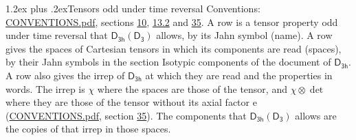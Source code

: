 \documentclass[10pt,a4paper]{article}
\makeatletter
\renewcommand\section{\@startsection{section}{1}{\z@}{-3ex plus -1ex minus -.2ex}%
  {1.2ex plus .2ex}{\normalfont\large\sffamily\bfseries\color{parttitle}}}
\numberwithin{equation}{section}
\newcommand{\grp}[1]{\mathsf{#1}}
\newcommand{\irrprod}{\otimes}
\makeatother
\begin{document}
\section{Tensors odd under time reversal}\label{s:time_odd}
Conventions: \href{../../CONVENTIONS.pdf}{CONVENTIONS.pdf}, sections \href{../../../rotation/CONVENTIONS.pdf\#conv.10}{10}, \href{../../../rotation/CONVENTIONS.pdf\#conv.13.2}{13.2} and \href{../../CONVENTIONS.pdf\#conv.35}{35}.
\leavevmode\label{n:head.name.property}A row is a tensor property odd under time reversal that $\grp{D_{3h}}(\grp{D_{3}})$ allows, by its Jahn symbol (name). \label{n:head.spaces}A row gives the spaces of Cartesian tensors in which its components are read (spaces), by their Jahn symbols in the section Isotypic components of the document of \href{../../../rotation/data/pdf/D3h.pdf}{$\grp{D_{3h}}$}. \label{n:head.properties}A row also gives the irrep of $\grp{D_{3h}}$ at which they are read and the properties in words. The irrep is $\chi$ where the spaces are those of the tensor, and $\chi \irrprod \det$ where they are those of the tensor without its axial factor e (\href{../../CONVENTIONS.pdf}{CONVENTIONS.pdf}, section \href{../../CONVENTIONS.pdf\#conv.35}{35}). The components that $\grp{D_{3h}}(\grp{D_{3}})$ allows are the copies of that irrep in those spaces.
\end{document}
